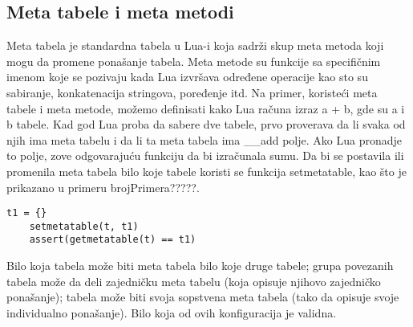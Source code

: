 \documentclass[a4paper]{article}
\begin{document}
\subsection{Meta tabele i meta metodi}
Meta tabela je standardna tabela u Lua-i koja sadrži skup meta metoda koji mogu da promene ponašanje tabela. Meta metode su funkcije sa specifičnim imenom koje se pozivaju kada Lua izvršava određene operacije kao sto su sabiranje, konkatenacija stringova, poređenje itd. Na primer, koristeći meta tabele i meta metode, možemo definisati kako Lua računa izraz a + b, gde su a i b tabele. Kad god Lua proba da sabere dve tabele, prvo proverava da li svaka od njih ima meta tabelu i da li ta meta tabela ima \_\_add polje. Ako Lua pronadje to polje, zove odgovarajuću funkciju da bi izračunala sumu.
Da bi se postavila ili promenila meta tabela bilo koje tabele koristi se funkcija setmetatable, kao što je prikazano u primeru brojPrimera?????.
\begin{verbatim}
t1 = {}
    setmetatable(t, t1)
    assert(getmetatable(t) == t1)
\end{verbatim}
Bilo koja tabela može biti meta tabela bilo koje druge tabele; grupa povezanih tabela može da deli zajedničku meta tabelu (koja opisuje njihovo zajedničko ponašanje); tabela može biti svoja sopstvena meta tabela (tako da opisuje svoje individualno ponašanje). Bilo koja od ovih konfiguracija je validna.
\end{document}
